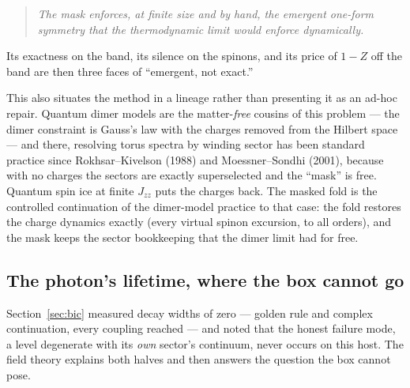 \documentclass[11pt,a4paper]{article}
\newcommand{\Jzz}{J_{zz}}
\begin{document}
\begin{quote}
\emph{The mask enforces, at finite size and by hand, the emergent one-form
symmetry that the thermodynamic limit would enforce dynamically.}
\end{quote}

Its exactness on the band, its silence on the spinons, and its price of
$1-Z$ off the band are then three faces of ``emergent, not exact.''

This also situates the method in a lineage rather than presenting it as an
ad-hoc repair.  Quantum dimer models are the matter-\emph{free} cousins of
this problem --- the dimer constraint is Gauss's law with the charges
removed from the Hilbert space --- and there, resolving torus spectra by
winding sector has been standard practice since Rokhsar--Kivelson (1988) and
Moessner--Sondhi (2001), because with no charges the sectors are exactly
superselected and the ``mask'' is free.  Quantum spin ice at finite $\Jzz$
puts the charges back.  The masked fold is the controlled continuation of
the dimer-model practice to that case: the fold restores the charge dynamics
exactly (every virtual spinon excursion, to all orders), and the mask keeps
the sector bookkeeping that the dimer limit had for free.

\subsection{The photon's lifetime, where the box cannot go}
\label{sec:gaugelifetime}

Section~\ref{sec:bic} measured decay widths of zero --- golden rule and
complex continuation, every coupling reached --- and noted that the honest
failure mode, a level degenerate with its \emph{own} sector's continuum,
never occurs on this host.  The field theory explains both halves and then
answers the question the box cannot pose.
\end{document}
